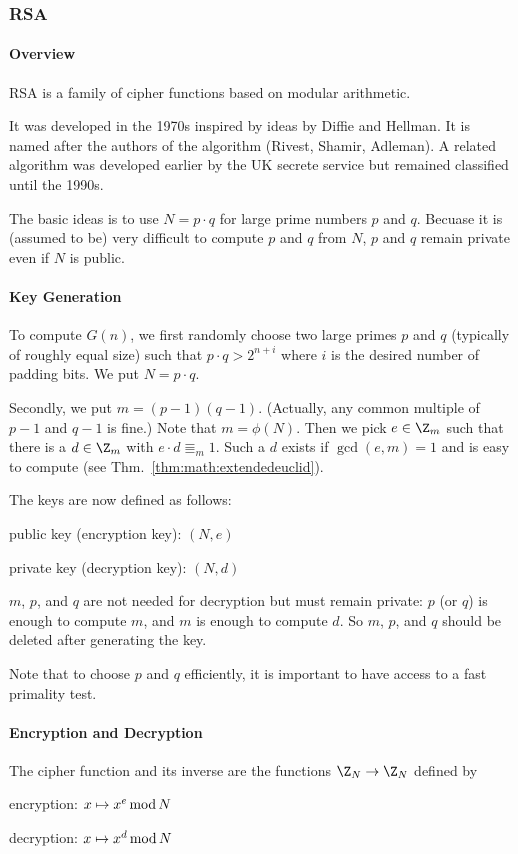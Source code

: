 \subsubsection{RSA}

\paragraph{Overview}
RSA is a family of cipher functions based on modular arithmetic.

It was developed in the 1970s inspired by ideas by Diffie and Hellman.
It is named after the authors of the algorithm (Rivest, Shamir, Adleman).
A related algorithm was developed earlier by the UK secrete service but remained classified until the 1990s.

The basic ideas is to use $N=p\cdot q$ for large prime numbers $p$ and $q$.
Becuase it is (assumed to be) very difficult to compute $p$ and $q$ from $N$, $p$ and $q$ remain private even if $N$ is public.

\paragraph{Key Generation}
To compute $G(n)$, we first randomly choose two large primes $p$ and $q$ (typically of roughly equal size) such that $p\cdot q>2^{n+i}$ where $i$ is the desired number of padding bits.
We put $N=p\cdot q$.

Secondly, we put $m=(p-1)(q-1)$. (Actually, any common multiple of $p-1$ and $q-1$ is fine.)
Note that $m=\phi(N)$.
Then we pick $e\in \Z_m$ such that there is a $d\in\Z_m$ with $e\cdot d\Equiv_m 1$.
Such a $d$ exists if $\gcd(e,m)=1$ and is easy to compute (see Thm.~\ref{thm:math:extendedeuclid}).

The keys are now defined as follows:
\begin{compactitem}
 \item public key (encryption key): $(N,e)$
 \item private key (decryption key): $(N,d)$
\end{compactitem}
$m$, $p$, and $q$ are not needed for decryption but must remain private: $p$ (or $q$) is enough to compute $m$, and $m$ is enough to compute $d$.
So $m$, $p$, and $q$ should be deleted after generating the key.

Note that to choose $p$ and $q$ efficiently, it is important to have access to a fast primality test.

\paragraph{Encryption and Decryption}
The cipher function and its inverse are the functions $\Z_N\to \Z_N$ defined by
\begin{compactitem}
 \item encryption: $x\mapsto x^e\mathop{\mathrm{mod}} N$
 \item decryption: $x\mapsto x^d\mathop{\mathrm{mod}} N$
\end{compactitem}

